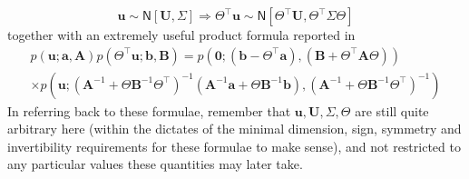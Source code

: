 \documentclass[preprint,12pt]{elsarticle}
\newcommand*{\M}[1]{\ensuremath{#1}\xspace}
\newcommand*{\vr}[1]{\M{\mathbf{#1}}}
\newcommand*{\gauss}[2]{\mathsf{N}\!\left\lbrack{} #1 , #2 \right\rbrack}
\begin{document}
        \begin{equation} \label{eq:Method:scaling}
            \vr{u} \sim \gauss{\vr{U}}{\Sigma} \Rightarrow
            \Theta^{\intercal}\vr{u} \sim \gauss{\Theta^{\intercal}\vr{U}}{\Theta^{\intercal}\Sigma\Theta}
        \end{equation}
        together with an extremely useful product formula reported in \cite{Rasmussen2016}
        \begin{multline} \label{eq:Method:product}
            p(\vr{u};\vr{a},\vr{A}) p(\Theta^{\intercal}\vr{u};\vr{b},\vr{B}) 
            = p\left(\vr{0}; (\vr{b}-\Theta^{\intercal}\vr{a})
            , (\vr{B} + \Theta^{\intercal}\vr{A}\Theta)\right) \\
            \times p\left(\vr{u}; (\vr{A}^{-1}+\Theta\vr{B}^{-1}\Theta^{\intercal})^{-1} 
            (\vr{A}^{-1}\vr{a}+\Theta\vr{B}^{-1}\vr{b})
            , (\vr{A}^{-1}+\Theta\vr{B}^{-1}\Theta^{\intercal})^{-1}\right)
        \end{multline}
        In referring back to these formulae, remember that $\vr{u}, \vr{U}, \Sigma, \Theta$ are still quite arbitrary here (within the dictates of the minimal dimension, sign, symmetry and invertibility requirements for these formulae to make sense), and not restricted to any particular values these quantities may later take.
\end{document}
